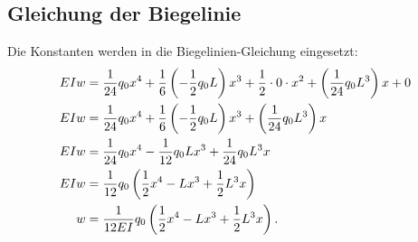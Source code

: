 \subsection{Gleichung der Biegelinie}
Die Konstanten werden in die Biegelinien-Gleichung eingesetzt:
\begin{align}
	EIw&=
	\frac{1}{24}q_0x^4+\frac{1}{6}\left(-\frac{1}{2}q_0L\right)x^3+\frac{1}{2}\cdot0\cdot x^2+\left(\frac{1}{24}q_0L^3\right)x+0
\label{balken:l62}
  \\
	EIw&=
	\frac{1}{24}q_0x^4+\frac{1}{6}\left(-\frac{1}{2}q_0L\right)x^3+\left(\frac{1}{24}q_0L^3\right)x
\notag
	\\
	EIw&=
	\frac{1}{24}q_0x^4-\frac{1}{12}q_0Lx^3+\frac{1}{24}q_0L^3x
\notag
	\\
	EIw&=
	\frac{1}{12}q_0\left(\frac{1}{2}x^4-Lx^3+\frac{1}{2}L^3x\right)
\notag
	\\
	w&=
	\frac{1}{12EI}q_0\left(\frac{1}{2}x^4-Lx^3+\frac{1}{2}L^3x\right).
\notag
\end{align}

